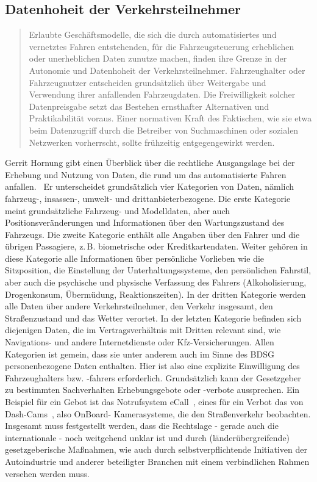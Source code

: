 \documentclass[twoside,a4paper,12pt]{article}
\begin{document}
\subsection{Datenhoheit der Verkehrsteilnehmer} \label{DatenhoheitDerVerkehrsteilnehmer}

\begin{quote}
\glqq
Erlaubte Geschäftsmodelle, die sich die durch automatisiertes und vernetztes Fahren entstehenden, für die Fahrzeugsteuerung 
erheblichen oder unerheblichen Daten zunutze
machen, finden ihre Grenze in der Autonomie und Datenhoheit der Verkehrsteilnehmer.
Fahrzeughalter oder Fahrzeugnutzer entscheiden grundsätzlich über Weitergabe und
Verwendung ihrer anfallenden Fahrzeugdaten. Die Freiwilligkeit solcher Datenpreisgabe
setzt das Bestehen ernsthafter Alternativen und Praktikabilität voraus. Einer normativen
Kraft des Faktischen, wie sie etwa beim Datenzugriff durch die Betreiber von Suchmaschinen oder sozialen Netzwerken vorherrscht, 
sollte frühzeitig entgegengewirkt werden.\grqq\mbox{~\cite[S. 12]{ek}}
\end{quote}

Gerrit Hornung gibt einen Überblick über die rechtliche Ausgangslage bei der Erhebung und Nutzung von Daten, die rund um das automatisierte Fahren
anfallen.~\cite{ho} Er unterscheidet grundsätzlich vier Kategorien von Daten, nämlich fahrzeug-, insassen-, umwelt- und 
drittanbieterbezogene. Die erste Kategorie meint grundsätzliche Fahrzeug- und Modelldaten, aber auch Positionsveränderungen und Informationen über den
Wartungszustand des Fahrzeugs. Die zweite Kategorie enthält alle Angaben über den Fahrer und die übrigen Passagiere, z.\,B. biometrische oder Kreditkartendaten.
Weiter gehören in diese Kategorie alle Informationen über persönliche Vorlieben wie die Sitzposition, die Einstellung der Unterhaltungssysteme, den
persönlichen Fahrstil, aber auch die psychische und physische Verfassung des Fahrers (Alkoholisierung, Drogenkonsum, Übermüdung, Reaktionszeiten).
In der dritten Kategorie werden alle Daten über andere Verkehrsteilnehmer, den Verkehr insgesamt, den Straßenzustand und das Wetter verortet.
In der letzten Kategorie befinden sich diejenigen Daten, die im Vertragsverhältnis mit Dritten relevant sind, wie Navigations- und andere Internetdienste oder
Kfz-Versicherungen.
Allen Kategorien ist gemein, dass sie unter anderem auch im Sinne des BDSG personenbezogene Daten enthalten. Hier ist also eine explizite Einwilligung
des Fahrzeughalters bzw. -fahrers erforderlich. Grundsätzlich kann der Gesetzgeber zu bestimmten Sachverhalten Erhebungsgebote oder -verbote aussprechen.
Ein Beispiel für ein Gebot ist das Notrufsystem eCall\mbox{~\cite[S. 362]{ho}}, eines für ein Verbot das von Dash-Cams\mbox{~\cite[S. 363]{ho}}, also OnBoard-
Kamerasysteme, die den Straßenverkehr beobachten. Insgesamt muss festgestellt werden, dass die Rechtslage - gerade auch die internationale - noch weitgehend 
unklar ist und durch (länderübergreifende) gesetzgeberische Maßnahmen, wie auch durch selbstverpflichtende Initiativen der Autoindustrie und anderer beteiligter 
Branchen mit einem verbindlichen Rahmen versehen werden muss.
\end{document}
